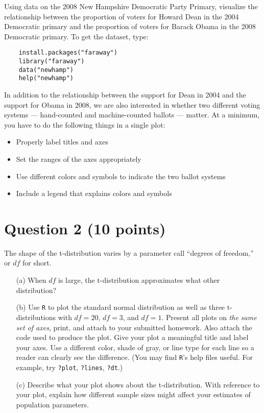 \documentclass[12pt,letterpaper]{article}
\begin{document}
	Using data on the 2008 New Hampshire Democratic Party Primary, visualize the relationship between the proportion of voters for Howard Dean in the 2004 Democratic primary and the proportion of voters for Barack Obama in the 2008 Democratic primary. To get the dataset, type:
	\begin{verbatim}
	install.packages("faraway")
	library("faraway")
	data("newhamp")
	help("newhamp")
	\end{verbatim}
	\newpage
	\noindent In addition to the relationship between the support for Dean in 2004 and the support for Obama in 2008, we are also interested in whether two different voting systems --- hand-counted and machine-counted ballots --- matter. At a minimum, you have to do the following things in a single plot:
	\begin{itemize}
		\item Properly label titles and axes
		\item Set the ranges of the axes appropriately
		\item Use different colors and symbols to indicate the two ballot systems
		\item Include a legend that explains colors and symbols
	\end{itemize}
	
		\vspace{7em}
	
	
	
	\section*{Question 2 (10 points)}
	The shape of the t-distribution varies by a parameter call ``degrees of freedom,'' or $df$ for short.
	
	
	\begin{itemize}
		
		\item[(a)] When $df$ is large, the t-distribution approximates what other distribution?\\
		\vspace{7em}
		
		
		\item[(b)] Use \texttt{R} to plot the standard normal distribution as well as three t-distributions with $df = 20$, $df = 3$, and $df = 1$. Present all plots on \emph{the same set of axes}, print, and attach to your submitted homework.  Also attach the code used to produce the plot.  Give your plot a meaningful title and label your axes. Use a different color, shade of gray, or line type for each line so a reader can clearly see the difference. (You may find \texttt{R}'s help files useful. For example, try \texttt{?plot}, \texttt{?lines}, \texttt{?dt}.)\\

		
\newpage		
		\item[(c)] Describe what your plot shows about the t-distribution. With reference to your plot, explain how different sample sizes might affect your estimates of population parameters.\\
		
	\end{itemize}
	
\end{document}
